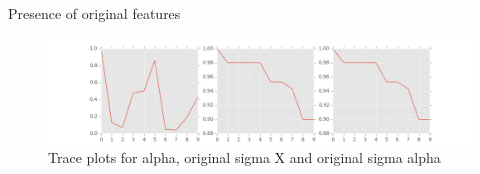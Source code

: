 \documentclass[11pt]{article}
\begin{document}
\begin{table}[ht]
\centering
\caption{Presence of original features \label{featu}}

\end{table}

\begin{figure}
\includegraphics[width=\linewidth]{data_files/trace_plots.png}
\caption {Trace plots for alpha, original sigma X and original sigma alpha}
\label{fig:da}
\end{figure}
\end{document}
